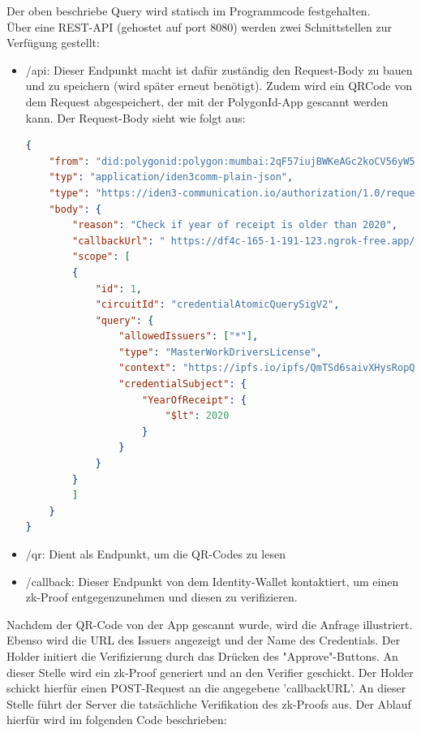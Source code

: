Der oben beschriebe Query wird statisch im Programmcode festgehalten. \\
Über eine REST-API (gehostet auf port 8080) werden zwei Schnittstellen zur Verfügung gestellt:
\begin{itemize}
	\item /api: Dieser Endpunkt macht ist dafür zuständig den Request-Body zu bauen und zu speichern (wird später erneut benötigt). Zudem wird ein QRCode von dem Request abgespeichert, der mit der PolygonId-App gescannt werden kann. Der Request-Body sieht wie folgt aus:
	
\begin{lstlisting}[language=json,firstnumber=1]
{
	"from": "did:polygonid:polygon:mumbai:2qF57iujBWKeAGc2koCV56yW5S1SfPtFsCgDHzGRdW",
	"typ": "application/iden3comm-plain-json",
	"type": "https://iden3-communication.io/authorization/1.0/request",
	"body": {
		"reason": "Check if year of receipt is older than 2020",
		"callbackUrl": " https://df4c-165-1-191-123.ngrok-free.app/api/callback?sessionId=1",
		"scope": [
		{
			"id": 1,
			"circuitId": "credentialAtomicQuerySigV2",
			"query": {
				"allowedIssuers": ["*"],
				"type": "MasterWorkDriversLicense",
				"context": "https://ipfs.io/ipfs/QmTSd6saivXHysRopQdM1yswp2qyFwobL7fwuFpkVTS8gd",
				"credentialSubject": {
					"YearOfReceipt": {
						"$lt": 2020
					}
				}
			}
		}
		]
	}
}
\end{lstlisting}	
	\item /qr: Dient als Endpunkt, um die QR-Codes zu lesen
	\item /callback: Dieser Endpunkt von dem Identity-Wallet kontaktiert, um einen zk-Proof entgegenzunehmen und diesen zu verifizieren.
\end{itemize}
Nachdem der QR-Code von der App gescannt wurde, wird die Anfrage illustriert. Ebenso wird die URL des Issuers angezeigt und der Name des Credentials. Der Holder initiert die Verifizierung durch das Drücken des "Approve"-Buttons. An dieser Stelle wird ein zk-Proof generiert und an den Verifier geschickt. Der Holder schickt hierfür einen POST-Request an die angegebene 'callbackURL'. An dieser Stelle führt der Server die tatsächliche Verifikation des zk-Proofs aus. Der Ablauf hierfür wird im folgenden Code beschrieben:
